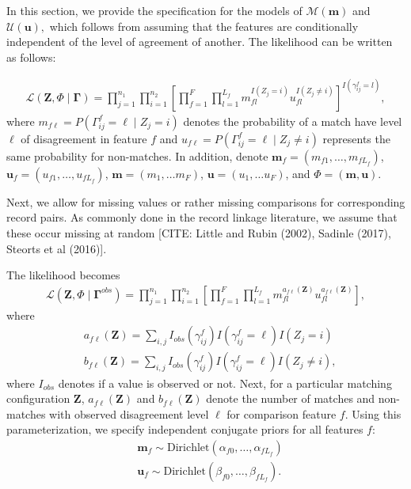 \documentclass[12pt,letterpaper]{article}
\newcommand{\1}[1]{\mathbb{I}\!\left[#1\right]} %
\begin{document}
In this section, we provide the specification for the models of $\mathcal{M}(\bm{m})$ and $\mathcal{U}(\bm{u}),$ which follows from assuming that the features are conditionally independent of the level of agreement of another. The likelihood can be written as follows:

\begin{align}
\mathcal{L}(\bm{Z}, \Phi \mid \bm{\Gamma}) = \prod_{j=1}^{n_1}  \prod_{i=1}^{n_2}\left[ \prod_{f=1}^{F}\prod_{l=1}^{L_f} m_{fl}^{I(Z_j = i)}u_{fl}^{I(Z_j \neq i)}\right]^{I(\gamma_{ij}^f = l)}, 
\end{align}
where $m_{f\ell} = P(\Gamma_{ij}^f = \ell \mid Z_j = i)$ denotes the probability of a match have level $\ell$ of disagreement in feature $f$ and 
$u_{f\ell} = P(\Gamma_{ij}^f = \ell \mid Z_j \neq i)$ represents the same probability for non-matches. 
In addition, denote $\bm{m}_f = (m_{f1}, \ldots, m_{fL_f})$, $\bm{u}_f = (u_{f1}, \ldots, u_{fL_f})$, 
$\bm{m}= (m_1, \ldots m_F)$, $\bm{u}= (u_1, \ldots u_F)$, and $\Phi = (\bm{m}, \bm{u})$.

Next, we allow for missing values or rather missing comparisons for corresponding record pairs. As commonly done in the record linkage literature, we assume that these occur missing at random [CITE: Little and Rubin (2002), Sadinle (2017), Steorts et al (2016)]. 

The likelihood becomes 
\begin{align}
\mathcal{L}(\bm{Z}, \Phi \mid \bm{\Gamma}^{obs}) = 
\prod_{j=1}^{n_1}  \prod_{i=1}^{n_2}\left[ \prod_{f=1}^{F}\prod_{l=1}^{L_f} m_{fl}^{a_{f\ell}(\bm{Z})}u_{fl}^{a_{f\ell}(\bm{Z})}\right], 
\end{align}
where 
\begin{align}
&a_{f\ell}(\bm{Z}) = \sum_{i,j} I_{obs}(\gamma_{ij}^f)I(\gamma_{ij}^f = \ell) I(Z_j = i) \\
&b_{f\ell}(\bm{Z}) = \sum_{i,j} I_{obs}(\gamma_{ij}^f) I(\gamma_{ij}^f = \ell) I(Z_j \neq i),
\end{align}
where $I_{obs}$ denotes if a value is observed or not. Next, for a particular matching configuration $\bm{Z}$, $a_{f\ell}(\bm{Z})$
and $b_{f\ell}(\bm{Z})$ denote the number of matches and non-matches with observed disagreement level $\ell$ for comparison feature $f.$ Using this parameterization, we specify independent conjugate priors for all features $f$:
\begin{align}
&\bm{m}_f \sim \text{Dirichlet}(\alpha_{f0}, \ldots, \alpha_{f L_f}) \\
&\bm{u}_f \sim \text{Dirichlet}(\beta_{f0}, \ldots, \beta_{f L_f}).
\end{align}
\end{document}
